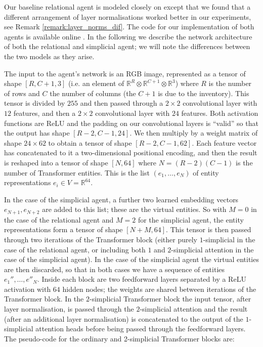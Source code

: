 \documentclass{article} %
\begin{document}
Our baseline relational agent is modeled closely on \citep{zambaldi} except that we found that a different arrangement of layer normalisations worked better in our experiments, see Remark \ref{remark:layer_norms_dif}. The code for our implementation of both agents is available online \citep{repo}.  
In the following we describe the network architecture of both the relational and simplicial agent; we will note the differences between the two models as they arise. 

The input to the agent's network is an RGB image, represented as a tensor of shape $[R, C+1, 3]$ (i.e. an element of $\mathbb{R}^{R} \otimes \mathbb{R}^{C+1} \otimes \mathbb{R}^3$) where $R$ is the number of rows and $C$ the number of columns (the $C+1$ is due to the inventory). This tensor is divided by $255$ and then passed through a $2 \times 2$ convolutional layer with $12$ features, and then a $2 \times 2$ convolutional layer with $24$ features. Both activation functions are ReLU and the padding on our convolutional layers is ``valid'' so that the output has shape $[R-2,C-1,24]$. We then multiply by a weight matrix of shape $24 \times 62$ to obtain a tensor of shape $[R-2,C-1,62]$. Each feature vector has concatenated to it a two-dimensional positional encoding, and then the result is reshaped into a tensor of shape $[N, 64]$ where $N = (R-2)(C-1)$ is the number of Transformer entities. This is the list $(e_1,\ldots,e_N)$ of entity representations $e_i \in V = \mathbb{R}^{64}$.

In the case of the simplicial agent, a further two learned embedding vectors $e_{N+1}, e_{N+2}$ are added to this list; these are the virtual entities. So with $M = 0$ in the case of the relational agent and $M = 2$ for the simplicial agent, the entity representations form a tensor of shape $[N+M, 64]$. This tensor is then passed through two iterations of the Transformer block (either purely $1$-simplicial in the case of the relational agent, or including both $1$ and $2$-simplicial attention in the case of the simplicial agent). In the case of the simplicial agent the virtual entities are then discarded, so that in both cases we have a sequence of entities $e_1'', \ldots, e''_{N}$.  Inside each block are two feedforward layers separated by a ReLU activation with $64$ hidden nodes; the weights are shared between iterations of the Transformer block. In the $2$-simplicial Transformer block the input tensor, after layer normalisation, is passed through the $2$-simplicial attention and the result (after an additional layer normalisation) is concatenated to the output of the $1$-simplicial attention heads before being passed through the feedforward layers.  The pseudo-code for the ordinary and 2-simplicial Transformer blocks are:
\end{document}
